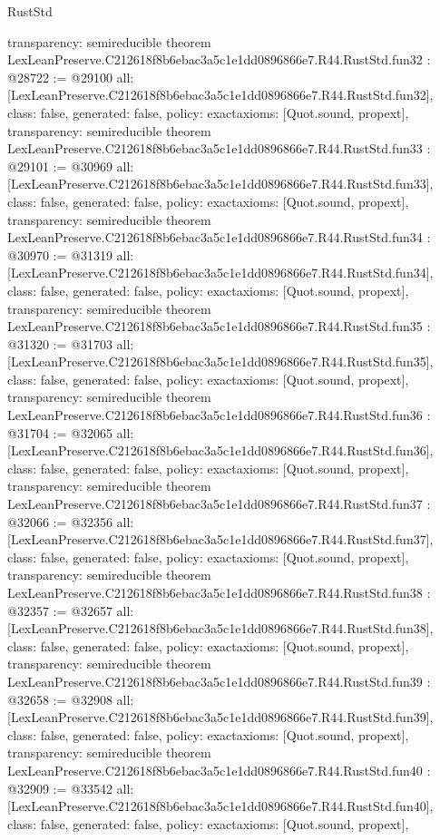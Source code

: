 \begin{lexlean}{RustStd}
\begin{coremodule}
{  transparency: semireducible
}
theorem LexLeanPreserve.C212618f8b6ebac3a5c1e1dd0896866e7.R44.RustStd.fun32 : @28722 := @29100 {
  all: [LexLeanPreserve.C212618f8b6ebac3a5c1e1dd0896866e7.R44.RustStd.fun32],
  class: false,
  generated: false,
  policy: exact{axioms: [Quot.sound, propext]},
  transparency: semireducible
}
theorem LexLeanPreserve.C212618f8b6ebac3a5c1e1dd0896866e7.R44.RustStd.fun33 : @29101 := @30969 {
  all: [LexLeanPreserve.C212618f8b6ebac3a5c1e1dd0896866e7.R44.RustStd.fun33],
  class: false,
  generated: false,
  policy: exact{axioms: [Quot.sound, propext]},
  transparency: semireducible
}
theorem LexLeanPreserve.C212618f8b6ebac3a5c1e1dd0896866e7.R44.RustStd.fun34 : @30970 := @31319 {
  all: [LexLeanPreserve.C212618f8b6ebac3a5c1e1dd0896866e7.R44.RustStd.fun34],
  class: false,
  generated: false,
  policy: exact{axioms: [Quot.sound, propext]},
  transparency: semireducible
}
theorem LexLeanPreserve.C212618f8b6ebac3a5c1e1dd0896866e7.R44.RustStd.fun35 : @31320 := @31703 {
  all: [LexLeanPreserve.C212618f8b6ebac3a5c1e1dd0896866e7.R44.RustStd.fun35],
  class: false,
  generated: false,
  policy: exact{axioms: [Quot.sound, propext]},
  transparency: semireducible
}
theorem LexLeanPreserve.C212618f8b6ebac3a5c1e1dd0896866e7.R44.RustStd.fun36 : @31704 := @32065 {
  all: [LexLeanPreserve.C212618f8b6ebac3a5c1e1dd0896866e7.R44.RustStd.fun36],
  class: false,
  generated: false,
  policy: exact{axioms: [Quot.sound, propext]},
  transparency: semireducible
}
theorem LexLeanPreserve.C212618f8b6ebac3a5c1e1dd0896866e7.R44.RustStd.fun37 : @32066 := @32356 {
  all: [LexLeanPreserve.C212618f8b6ebac3a5c1e1dd0896866e7.R44.RustStd.fun37],
  class: false,
  generated: false,
  policy: exact{axioms: [Quot.sound, propext]},
  transparency: semireducible
}
theorem LexLeanPreserve.C212618f8b6ebac3a5c1e1dd0896866e7.R44.RustStd.fun38 : @32357 := @32657 {
  all: [LexLeanPreserve.C212618f8b6ebac3a5c1e1dd0896866e7.R44.RustStd.fun38],
  class: false,
  generated: false,
  policy: exact{axioms: [Quot.sound, propext]},
  transparency: semireducible
}
theorem LexLeanPreserve.C212618f8b6ebac3a5c1e1dd0896866e7.R44.RustStd.fun39 : @32658 := @32908 {
  all: [LexLeanPreserve.C212618f8b6ebac3a5c1e1dd0896866e7.R44.RustStd.fun39],
  class: false,
  generated: false,
  policy: exact{axioms: [Quot.sound, propext]},
  transparency: semireducible
}
theorem LexLeanPreserve.C212618f8b6ebac3a5c1e1dd0896866e7.R44.RustStd.fun40 : @32909 := @33542 {
  all: [LexLeanPreserve.C212618f8b6ebac3a5c1e1dd0896866e7.R44.RustStd.fun40],
  class: false,
  generated: false,
  policy: exact{axioms: [Quot.sound, propext]},
}
\end{coremodule}
\end{lexlean}
